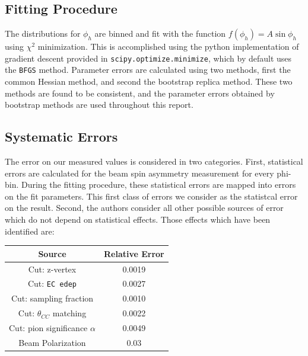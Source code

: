 \subsection{Fitting Procedure}
The distributions for $\phi_h$ are binned and fit with the function $f(\phi_h) = A\sin{\phi_h}$ using $\chi^2$ minimization.  This is accomplished using the python implementation of gradient descent provided in \texttt{scipy.optimize.minimize}, which by default uses the \texttt{BFGS} method.  Parameter errors are calculated using two methods, first the common Hessian method, and second the bootstrap replica method.  These two methods are found to be consistent, and the parameter errors obtained by bootstrap methods are used throughout this report.   
\\    

\subsection{Systematic Errors}


The error on our measured values is considered in two categories.  First, statistical errors are calculated for the beam spin asymmetry measurement for every phi-bin.  During the fitting procedure, these statistical errors are mapped into errors on the fit parameters.  This first class of errors we consider as the statistcal error on the result.  Second, the authors consider all other possible sources of error which do not depend on statistical effects.  Those effects which have been identified are: \\


\begin{center}
\begin{tabular}{ | c || c |  }
 \hline
 Source & Relative Error\\
 \hline
 Cut: z-vertex                   & 0.0019\\
 Cut: \texttt{EC edep}           & 0.0027\\
 Cut: sampling fraction          & 0.0010\\
 Cut: $\theta_{CC}$ matching     & 0.0022\\
 Cut: pion significance $\alpha$ & 0.0049\\
 Beam Polarization               & 0.03  \\
 \hline
\end{tabular}
\end{center}

